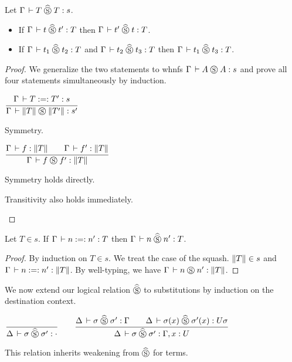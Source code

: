 \documentclass[a4paper,english]{lipics-utf8x}
\begin{document}
  \begin{lemma}
    \label{lem:s-per}
    Let $\Gamma \,\vdash T \mathrel{\widehat{\mathrel{\circledS}}} T : s$.
    \leavevmode
    \begin{itemize}
      \item If $\Gamma \,\vdash t \mathrel{\widehat{\mathrel{\circledS}}} t' : T$ then $\Gamma \,\vdash t' \mathrel{\widehat{\mathrel{\circledS}}} t : T$.
      \item If $\Gamma \,\vdash t_1 \mathrel{\widehat{\mathrel{\circledS}}} t_2 : T$ and $\Gamma \,\vdash t_2 \mathrel{\widehat{\mathrel{\circledS}}} t_3 : T$
      then $\Gamma \,\vdash t_1 \mathrel{\widehat{\mathrel{\circledS}}} t_3 : T$.
    \end{itemize}
  \end{lemma}

  \begin{proof}
    We generalize the two statements to whnfs $\Gamma \,\vdash A \mathrel{\circledS} A : s$ and
    prove all four statements simultaneously by induction.

    \begin{center}
    \(
      \ru{\Gamma \der T :=: T' : s
        }{\Gamma \der \squash{T} \Sr \squash{T'} : s'}
    \)
    \end{center}

    \begin{caselist}
      \nextcase Symmetry.
      \begin{center}
      \(
        \ru{\Gamma \der f : \squash{T} \qquad
            \Gamma \der f' : \squash{T}
          }{\Gamma \der f \Sr f' : \squash{T}}
      \)
      \end{center}
      Symmetry holds directly.

      \nextcase Transitivity also holds immediately.
    \end{caselist}
  \end{proof}

  \begin{lemma}
    Let $T \in s$.
    If $\Gamma \,\vdash n :=: n' : T$ then $\Gamma \,\vdash n \mathrel{\widehat{\mathrel{\circledS}}} n' : T$.
  \end{lemma}

  \begin{proof}
    By induction on $T \in s$. We treat the case of the squash.
    $\|T\| \in s$ and $\Gamma \,\vdash n :=: n' : \|T\|$.
    By well-typing, we have $\Gamma \,\vdash n \mathrel{\circledS} n' : \|T\|$.
  \end{proof}


  We now extend our logical relation $\mathrel{\widehat{\mathrel{\circledS}}}$ to substitutions by
  induction on the destination context.
  \begin{center}
  \(
    \ru{}{\Delta \der \sigma \hSr \sigma' : \cdot}
    \qquad
    \ru{\Delta \der \sigma \hSr \sigma' : \Gamma \qquad
        \Delta \der \sigma(x) \hSr \sigma'(x) : U \sigma
      }{\Delta \der \sigma \hSr \sigma' : \Gamma, x:U}
  \)
  \end{center}
  This relation inherits weakening from $\mathrel{\widehat{\mathrel{\circledS}}}$ for terms.
\end{document}
